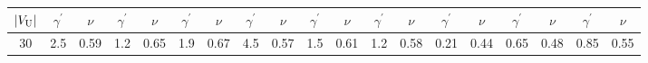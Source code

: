 \documentclass[10pt, letterpaper]{IEEEtran}
\begin{document}
\begin{CJK}{UTF8}{ipxm}
\begin{table*}[t]
\begin{center}
\begin{tabular}{c|cccccc|cccccc|cccccc}
      \hspace{-0.25cm} $|V_{\rm{U}}|$ \hspace{-0.25cm} & $\gamma^\prime$ &  \hspace{-0.25cm} $\nu$ & \hspace{-0.25cm} $\gamma^\prime$ & \hspace{-0.25cm} $\nu$ & \hspace{-0.25cm} $\gamma^\prime$ & \hspace{-0.25cm} $\nu$ & $\gamma^\prime$ & \hspace{-0.25cm} $\nu$ & \hspace{-0.25cm} $\gamma^\prime$ & \hspace{-0.25cm} $\nu$ & \hspace{-0.25cm} $\gamma^\prime$ & \hspace{-0.25cm} $\nu$ & $\gamma^\prime$ & \hspace{-0.25cm} $\nu$ & \hspace{-0.25cm} $\gamma^\prime$ & \hspace{-0.25cm} $\nu$ & \hspace{-0.25cm} $\gamma^\prime$ & \hspace{-0.25cm} $\nu$\\
      \hline
      30 & 2.5 & \hspace{-0.25cm} 0.59 & \hspace{-0.25cm} 1.2 & \hspace{-0.25cm} 0.65 & \hspace{-0.25cm} 1.9 & \hspace{-0.25cm} 0.67 & 4.5 & \hspace{-0.25cm} 0.57 & \hspace{-0.25cm} 1.5 & \hspace{-0.25cm} 0.61 & \hspace{-0.25cm} 1.2 & \hspace{-0.25cm} 0.58 & 0.21 & \hspace{-0.25cm} 0.44 & \hspace{-0.25cm} 0.65 & \hspace{-0.25cm} 0.48 & \hspace{-0.25cm} 0.85 & \hspace{-0.25cm} 0.55 \\

\end{tabular}
\end{center}
\end{table*}
\end{CJK}
\end{document}
